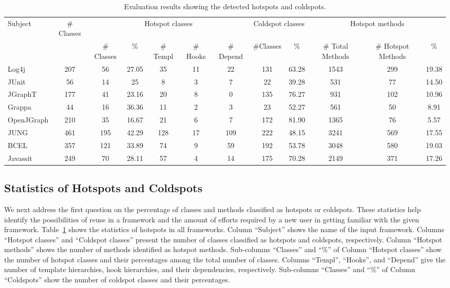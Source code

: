 \setlength{\tabcolsep}{1pt}
\begin{table}[t]
\begin{CodeOut}
\begin{center}
\begin {tabular} {|l|c|c|c|c|c|c|c|c|c|c|c|}
\hline
Subject&\# Classes&\multicolumn{5}{|c|}{Hotspot classes}&\multicolumn{2}{|c|}{Coldspot classes}&\multicolumn{3}{|c|}{Hotspot methods}\\
\cline{3-12}
&&\# Classes&\%&\# Templ&\# Hooks&\# Depend&\#Classes&\%&\# Total Methods&\# Hotspot Methods&\%\\
\hline Log4j        &207&56&27.05&35&11&22&131&63.28&1543&299&19.38\\
\hline JUnit            &56&14&25&8&3&7&22&39.28&531&77&14.50\\
\hline JGraphT      &177&41&23.16&20&8&0&135&76.27&931&102&10.96\\
\hline Grappa           &44&16&36.36&11&2&3&23&52.27&561&50&8.91\\
\hline OpenJGraph   &210&35&16.67&21&6&7&172&81.90&1365&76&5.57\\
\hline JUNG             &461&195&42.29&128&17&109&222&48.15&3241&569&17.55\\
\hline BCEL             &357&121&33.89&74&9&59&192&53.78&3048&580&19.03\\
\hline Javassit     &249&70&28.11&57&4&14&175&70.28&2149&371&17.26\\
\hline
\end{tabular}
\centering \caption {\label{tab:hotanddead} Evaluation results showing the
detected hotspots and coldspots.}
\end{center}
\end{CodeOut}
\end{table}
\subsection{Statistics of Hotspots and Coldspots}
\label{sec:hotspotsres}
We next address the first question on the percentage of classes and methods classified
as hotspots or coldspots. These statistics help identify the possibilities of reuse in a framework
and the amount of efforts required by a new user in getting familiar with the given framework.
Table~\ref{tab:hotanddead} shows the statistics of hotspots in all frameworks.
Column ``Subject'' shows the name of the input framework. Columns ``Hotspot classes''
and ``Coldspot classes'' present the number of classes classified as hotspots and
coldspots, respectively. Column ``Hotspot methods'' shows the number of methods identified
as hotspot methods. Sub-columns ``Classes'' and ``\%'' of Column ``Hotspot classes'' show the number of hotspot classes
and their percentages among the total number of classes. Columns ``Templ'', ``Hooks'', and ``Depend''
give the number of template hierarchies, hook hierarchies, and their dependencies, respectively. Sub-columns
``Classes'' and ``\%'' of Column ``Coldspots'' show the number of coldspot classes and their percentages.


